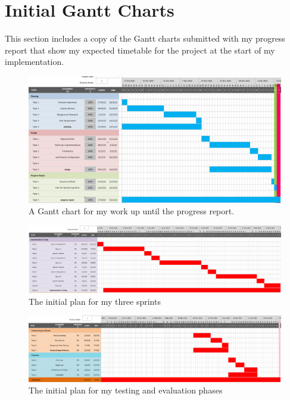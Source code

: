 
\section{Initial Gantt Charts}\label{app:init-gantt}

This section includes a copy of the Gantt charts submitted with my progress report that show my expected timetable for the project at the start of my implementation.

\begin{figure}[H]
  \includegraphics[width=\textwidth]{assets/images/charts/old-gantt/progress.png}
  \caption{A Gantt chart for my work up until the progress report.}
\end{figure}

\begin{figure}[H]
  \centering
  \includegraphics[width=\textwidth]{assets/images/charts/old-gantt/implementation-testing.png}
  \caption{The initial plan for my three sprints}
\end{figure}

\begin{figure}[H]
  \centering
  \includegraphics[width=\textwidth]{assets/images/charts/old-gantt/testing-evaluation.png}
  \caption{The initial plan for my testing and evaluation phases}
  \label{fig:final-gantt}
\end{figure}